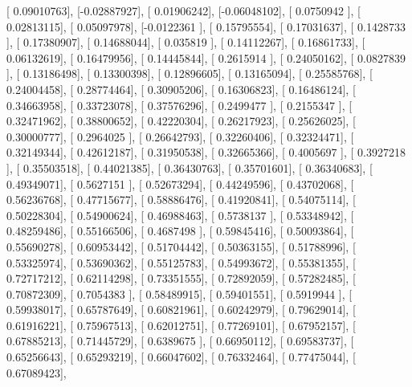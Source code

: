 \documentclass{article}
\begin{document}
       [ 0.09010763],
       [-0.02887927],
       [ 0.01906242],
       [-0.06048102],
       [ 0.0750942 ],
       [ 0.02813115],
       [ 0.05097978],
       [-0.0122361 ],
       [ 0.15795554],
       [ 0.17031637],
       [ 0.1428733 ],
       [ 0.17380907],
       [ 0.14688044],
       [ 0.035819  ],
       [ 0.14112267],
       [ 0.16861733],
       [ 0.06132619],
       [ 0.16479956],
       [ 0.14445844],
       [ 0.2615914 ],
       [ 0.24050162],
       [ 0.0827839 ],
       [ 0.13186498],
       [ 0.13300398],
       [ 0.12896605],
       [ 0.13165094],
       [ 0.25585768],
       [ 0.24004458],
       [ 0.28774464],
       [ 0.30905206],
       [ 0.16306823],
       [ 0.16486124],
       [ 0.34663958],
       [ 0.33723078],
       [ 0.37576296],
       [ 0.2499477 ],
       [ 0.2155347 ],
       [ 0.32471962],
       [ 0.38800652],
       [ 0.42220304],
       [ 0.26217923],
       [ 0.25626025],
       [ 0.30000777],
       [ 0.2964025 ],
       [ 0.26642793],
       [ 0.32260406],
       [ 0.32324471],
       [ 0.32149344],
       [ 0.42612187],
       [ 0.31950538],
       [ 0.32665366],
       [ 0.4005697 ],
       [ 0.3927218 ],
       [ 0.35503518],
       [ 0.44021385],
       [ 0.36430763],
       [ 0.35701601],
       [ 0.36340683],
       [ 0.49349071],
       [ 0.5627151 ],
       [ 0.52673294],
       [ 0.44249596],
       [ 0.43702068],
       [ 0.56236768],
       [ 0.47715677],
       [ 0.58886476],
       [ 0.41920841],
       [ 0.54075114],
       [ 0.50228304],
       [ 0.54900624],
       [ 0.46988463],
       [ 0.5738137 ],
       [ 0.53348942],
       [ 0.48259486],
       [ 0.55166506],
       [ 0.4687498 ],
       [ 0.59845416],
       [ 0.50093864],
       [ 0.55690278],
       [ 0.60953442],
       [ 0.51704442],
       [ 0.50363155],
       [ 0.51788996],
       [ 0.53325974],
       [ 0.53690362],
       [ 0.55125783],
       [ 0.54993672],
       [ 0.55381355],
       [ 0.72717212],
       [ 0.62114298],
       [ 0.73351555],
       [ 0.72892059],
       [ 0.57282485],
       [ 0.70872309],
       [ 0.7054383 ],
       [ 0.58489915],
       [ 0.59401551],
       [ 0.5919944 ],
       [ 0.59938017],
       [ 0.65787649],
       [ 0.60821961],
       [ 0.60242979],
       [ 0.79629014],
       [ 0.61916221],
       [ 0.75967513],
       [ 0.62012751],
       [ 0.77269101],
       [ 0.67952157],
       [ 0.67885213],
       [ 0.71445729],
       [ 0.6389675 ],
       [ 0.66950112],
       [ 0.69583737],
       [ 0.65256643],
       [ 0.65293219],
       [ 0.66047602],
       [ 0.76332464],
       [ 0.77475044],
       [ 0.67089423],
\end{document}
